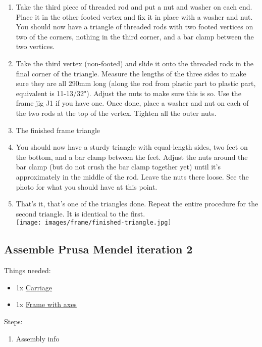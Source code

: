 \documentclass[11pt]{article}
\begin{document}
\begin{enumerate}
\item Take the third piece of threaded rod and put a nut and washer on each end. Place it in the other footed vertex and fix it in place with a washer and nut. You should now have a triangle of threaded rods with two footed vertices on two of the corners, nothing in the third corner, and a bar clamp between the two vertices.
\item Take the third vertex (non-footed) and slide it onto the threaded rods in the final corner of the triangle. Measure the lengths of the three sides to make sure they are all 290mm long (along the rod from plastic part to plastic part, equivalent is 11-13/32"). Adjust the nuts to make sure this is so. Use the frame jig J1 if you have one. Once done, place a washer and nut on each of the two rods at the top of the vertex. Tighten all the outer nuts.
\item The finished frame triangle
\item You should now have a sturdy triangle with equal-length sides, two feet on the bottom, and a bar clamp between the feet. Adjust the nuts around the bar clamp (but do not crush the bar clamp together yet) until it's approximately in the middle of the rod. Leave the nuts there loose. See the photo for what you should have at this point.
\item That's it, that's one of the triangles done. Repeat the entire procedure for the second triangle. It is identical to the first.\\ \texttt{[image: images/frame/finished-triangle.jpg]}
\end{enumerate}

\subsection{Assemble Prusa Mendel iteration 2}
Things needed:
\begin{itemize}
\item 1x \hyperlink{thing_carriage}{Carriage}
\item 1x \hyperlink{thing_frame-with-axes}{Frame with axes}
\end{itemize}
Steps:
\begin{enumerate}
\item Assembly info
\end{enumerate}

\newpage
\end{document}
